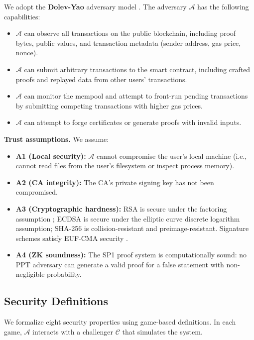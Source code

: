 \documentclass[11pt, a4paper]{article}
\providecommand{\tightlist}{%
  \setlength{\itemsep}{0pt}\setlength{\parskip}{0pt}}
\begin{document}
We adopt the \textbf{Dolev-Yao} adversary model \cite{ref11}. The adversary
\(\mathcal{A}\) has the following capabilities:

\begin{itemize}
\tightlist
\item
  \(\mathcal{A}\) can observe all transactions on the public blockchain,
  including proof bytes, public values, and transaction metadata (sender
  address, gas price, nonce).
\item
  \(\mathcal{A}\) can submit arbitrary transactions to the smart
  contract, including crafted proofs and replayed data from other users'
  transactions.
\item
  \(\mathcal{A}\) can monitor the mempool and attempt to front-run
  pending transactions by submitting competing transactions with higher
  gas prices.
\item
  \(\mathcal{A}\) can attempt to forge certificates or generate proofs
  with invalid inputs.
\end{itemize}

\textbf{Trust assumptions.} We assume:

\begin{itemize}
\tightlist
\item
  \textbf{A1 (Local security):} \(\mathcal{A}\) cannot compromise the
  user's local machine (i.e., cannot read files from the user's
  filesystem or inspect process memory).
\item
  \textbf{A2 (CA integrity):} The CA's private signing key has not been
  compromised.
\item
  \textbf{A3 (Cryptographic hardness):} RSA is secure under the
  factoring assumption \cite{ref12}; ECDSA is secure under the elliptic
  curve discrete logarithm assumption; SHA-256 is collision-resistant
  and preimage-resistant. Signature schemes satisfy EUF-CMA security
  \cite{ref24}.
\item
  \textbf{A4 (ZK soundness):} The SP1 proof system is computationally
  sound: no PPT adversary can generate a valid proof for a false
  statement with non-negligible probability.
\end{itemize}

\subsection{Security Definitions}\label{security-definitions}

We formalize eight security properties using game-based definitions. In
each game, \(\mathcal{A}\) interacts with a challenger \(\mathcal{C}\)
that simulates the system.
\end{document}
